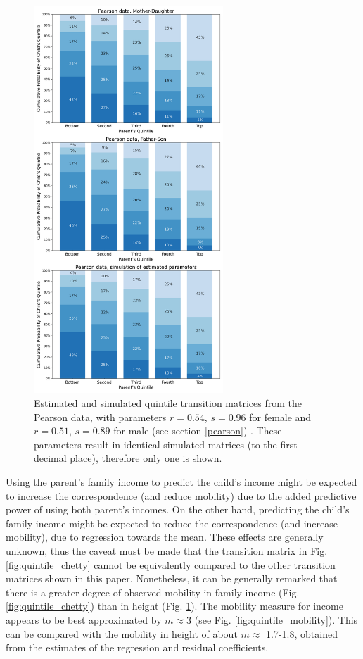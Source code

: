 \documentclass{svproc} %
\begin{document}
\begin{figure}[H]
\centering
\includegraphics[width=2.8in]{figures/quintile-pearson.png} 
\caption{Estimated and simulated quintile transition matrices from the Pearson data, with parameters $r = 0.54$, $s = 0.96$ for female and $r = 0.51$, $s = 0.89$ for male (see section \ref{pearson})  \cite{pearson}. These parameters result in identical simulated matrices (to the first decimal place), therefore only one is shown.}
\label{fig:quintile_pearson}
\end{figure}

Using the parent's family income to predict the child's income might be expected to increase the correspondence (and reduce mobility) due to the added predictive power of using both parent's incomes. On the other hand, predicting the child's family income might be expected to reduce the correspondence (and increase mobility), due to regression towards the mean. These effects are generally unknown, thus the caveat must be made that the transition matrix in Fig. \ref{fig:quintile_chetty} cannot be equivalently compared to the other transition matrices shown in this paper. Nonetheless, it can be generally remarked that there is a greater degree of observed mobility in family income (Fig. \ref{fig:quintile_chetty}) than in height (Fig. \ref{fig:quintile_pearson}). The mobility measure for income appears to be best approximated by $m \approx 3$ (see Fig. \ref{fig:quintile_mobility}). This can be compared with the mobility in height of about $m \approx$ 1.7-1.8, obtained from the estimates of the regression and residual coefficients.
\end{document}
